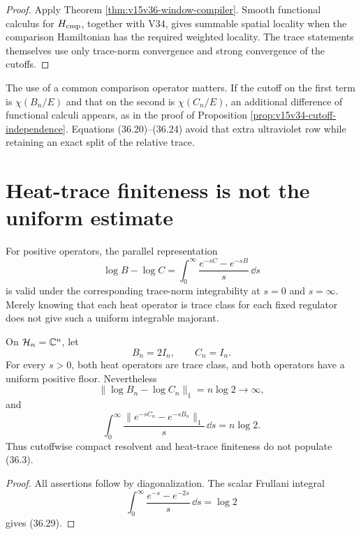 \documentclass[11pt]{article}
\theoremstyle{remark}
\begin{document}
\begin{proof}
Apply Theorem \ref{thm:v15v36-window-compiler}.  Smooth functional
calculus for \(H_{\rm cmp}\), together with V34, gives summable
spatial locality when the comparison Hamiltonian has the required
weighted locality.  The trace statements themselves use only
trace-norm convergence and strong convergence of the cutoffs.
\end{proof}

The use of a common comparison operator matters.  If the cutoff on
the first term is \(\chi(B_n/E)\) and that on the second is
\(\chi(C_n/E)\), an additional difference of functional calculi
appears, as in the proof of Proposition
\ref{prop:v15v34-cutoff-independence}.  Equations (36.20)--(36.24)
avoid that extra ultraviolet row while retaining an exact split of
the relative trace.

\section{Heat-trace finiteness is not the uniform estimate}

For positive operators, the parallel representation
\[
 \log B-\log C
 =\int_0^\infty\frac{e^{-sC}-e^{-sB}}{s}\,\dd s           \tag{36.26}
\]
is valid under the corresponding trace-norm integrability at
\(s=0\) and \(s=\infty\).  Merely knowing that each heat operator is
trace class for each fixed regulator does not give such a uniform
integrable majorant.

\begin{countertheorem}
\label{cth:v15v36-heat-not-uniform}
On \({\cal H}_n=\mathbb C^n\), let
\[
 B_n=2I_n,\qquad C_n=I_n.                                \tag{36.27}
\]
For every \(s>0\), both heat operators are trace class, and both
operators have a uniform positive floor.  Nevertheless
\[
 \|\log B_n-\log C_n\|_1=n\log2\longrightarrow\infty,     \tag{36.28}
\]
and
\[
 \int_0^\infty
 \frac{\|e^{-sC_n}-e^{-sB_n}\|_1}{s}\,\dd s
 =n\log2.                                                \tag{36.29}
\]
Thus cutoffwise compact resolvent and heat-trace finiteness do not
populate (36.3).
\end{countertheorem}

\begin{proof}
All assertions follow by diagonalization.  The scalar Frullani
integral
\[
 \int_0^\infty\frac{e^{-s}-e^{-2s}}s\,\dd s=\log2
\]
gives (36.29).
\end{proof}
\end{document}
